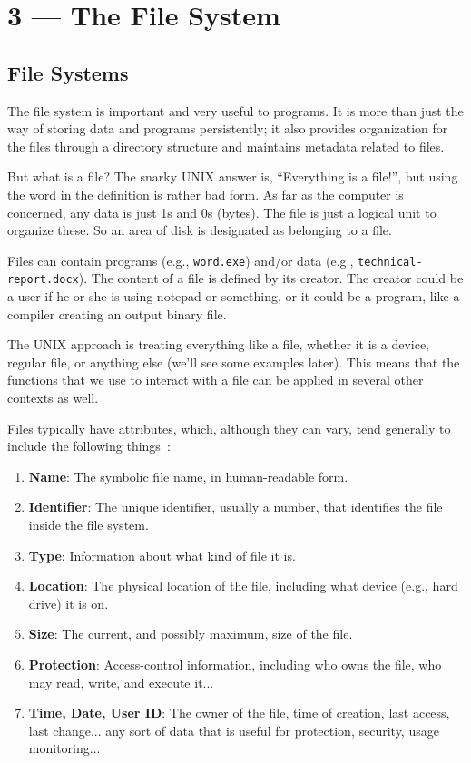 \documentclass[a4paper]{report}
\begin{document}
\chapter*{3 --- The File System}


\section*{File Systems}

The file system is important and very useful to programs. It is more than just the way of storing data and programs persistently; it also provides organization for the files through a directory structure and maintains metadata related to files.

But what is a file? The snarky UNIX answer is, ``Everything is a file!'', but using the word in the definition is rather bad form. As far as the computer is concerned, any data is just 1s and 0s (bytes). The file is just a logical unit to organize these. So an area of disk is designated as belonging to a file.

Files can contain programs (e.g., \texttt{word.exe}) and/or data (e.g., \texttt{technical-report.docx}). The content of a file is defined by its creator. The creator could be a user if he or she is using notepad or something, or it could be a program, like a compiler creating an output binary file.

The UNIX approach is treating everything like a file, whether it is a device, regular file, or anything else (we'll see some examples later). This means that the functions that we use to interact with a file can be applied in several other contexts as well.

Files typically have attributes, which, although they can vary, tend generally to include the following things~\cite{osc}:

\begin{enumerate}
	\item \textbf{Name}: The symbolic file name, in human-readable form.
	\item \textbf{Identifier}: The unique identifier, usually a number, that identifies the file inside the file system.
	\item \textbf{Type}: Information about what kind of file it is.
	\item \textbf{Location}: The physical location of the file, including what device (e.g., hard drive) it is on.
	\item \textbf{Size}: The current, and possibly maximum, size of the file.
	\item \textbf{Protection}: Access-control information, including who owns the file, who may read, write, and execute it...
	\item \textbf{Time, Date, User ID}: The owner of the file, time of creation, last access, last change... any sort of data that is useful for protection, security, usage monitoring...
\end{enumerate}
\end{document}
